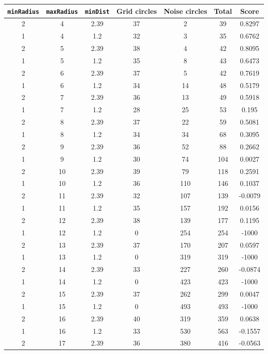 \documentclass[letterpaper, 12pt]{article}
\begin{document}
\begin{longtable}{|c|c|c|c|c|c|c|}
\hline
\textbf{\texttt{minRadius}} & \textbf{\texttt{maxRadius}} & \textbf{\texttt{minDist}} & \textbf{Grid circles} & \textbf{Noise circles} & \textbf{Total} & \textbf{Score} \\
\hline
2 & 4 & 2.39 & 37 & 2 & 39 & 0.8297 \\
\hline
1 & 4 & 1.2 & 32 & 3 & 35 & 0.6762 \\
\hline
2 & 5 & 2.39 & 38 & 4 & 42 & 0.8095 \\
\hline
1 & 5 & 1.2 & 35 & 8 & 43 & 0.6473 \\
\hline
2 & 6 & 2.39 & 37 & 5 & 42 & 0.7619 \\
\hline
1 & 6 & 1.2 & 34 & 14 & 48 & 0.5179 \\
\hline
2 & 7 & 2.39 & 36 & 13 & 49 & 0.5918 \\
\hline
1 & 7 & 1.2 & 28 & 25 & 53 & 0.195 \\
\hline
2 & 8 & 2.39 & 37 & 22 & 59 & 0.5081 \\
\hline
1 & 8 & 1.2 & 34 & 34 & 68 & 0.3095 \\
\hline
2 & 9 & 2.39 & 36 & 52 & 88 & 0.2662 \\
\hline
1 & 9 & 1.2 & 30 & 74 & 104 & 0.0027 \\
\hline
2 & 10 & 2.39 & 39 & 79 & 118 & 0.2591 \\
\hline
1 & 10 & 1.2 & 36 & 110 & 146 & 0.1037 \\
\hline
2 & 11 & 2.39 & 32 & 107 & 139 & -0.0079 \\
\hline
1 & 11 & 1.2 & 35 & 157 & 192 & 0.0156 \\
\hline
2 & 12 & 2.39 & 38 & 139 & 177 & 0.1195 \\
\hline
1 & 12 & 1.2 & 0 & 254 & 254 & -1000 \\
\hline
2 & 13 & 2.39 & 37 & 170 & 207 & 0.0597 \\
\hline
1 & 13 & 1.2 & 0 & 319 & 319 & -1000 \\
\hline
2 & 14 & 2.39 & 33 & 227 & 260 & -0.0874 \\
\hline
1 & 14 & 1.2 & 0 & 423 & 423 & -1000 \\
\hline
2 & 15 & 2.39 & 37 & 262 & 299 & 0.0047 \\
\hline
1 & 15 & 1.2 & 0 & 493 & 493 & -1000 \\
\hline
2 & 16 & 2.39 & 40 & 319 & 359 & 0.0638 \\
\hline
1 & 16 & 1.2 & 33 & 530 & 563 & -0.1557 \\
\hline
2 & 17 & 2.39 & 36 & 380 & 416 & -0.0563 \\

\end{longtable}
\end{document}
